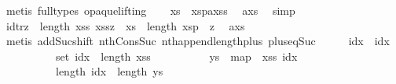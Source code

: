 \begin{isabellebody}
\ {\isacharparenleft}{\kern0pt}metis\ {\isacharparenleft}{\kern0pt}full{\isacharunderscore}{\kern0pt}types{\isacharcomma}{\kern0pt}\ opaque{\isacharunderscore}{\kern0pt}lifting{\isacharparenright}{\kern0pt}{\isacharparenright}{\kern0pt}\isanewline
\ \ \isamarkupfalse%
\ {\isachardoublequoteopen}xs\ {\isacharequal}{\kern0pt}\ {\isacharparenleft}{\kern0pt}xsp{\isacharat}{\kern0pt}{\isacharbrackleft}{\kern0pt}a{\isacharbrackright}{\kern0pt}{\isacharparenright}{\kern0pt}{\isacharat}{\kern0pt}xss{\isachardoublequoteclose}\ \isamarkupfalse%
\ a{\isacharunderscore}{\kern0pt}xs{\isacharparenleft}{\kern0pt}{}{\isacharparenright}{\kern0pt}\ \isamarkupfalse%
\ simp\isanewline
\ \ \isamarkupfalse%
\ id{\isacharunderscore}{\kern0pt}tr{\isacharcolon}{\kern0pt}{\isachardoublequoteopen}{\isasymforall}z\ {\isacharless}{\kern0pt}\ length\ xss{\isachardot}{\kern0pt}\ xss{\isacharbang}{\kern0pt}z\ {\isacharequal}{\kern0pt}\ xs{\isacharbang}{\kern0pt}{\isacharparenleft}{\kern0pt}{}\ {\isacharplus}{\kern0pt}\ length\ xsp\ {\isacharplus}{\kern0pt}\ z{\isacharparenright}{\kern0pt}{\isachardoublequoteclose}\ \isamarkupfalse%
\ a{\isacharunderscore}{\kern0pt}xs{\isacharparenleft}{\kern0pt}{}{\isacharparenright}{\kern0pt}\isanewline
\ \ \ \ \isamarkupfalse%
\ {\isacharparenleft}{\kern0pt}metis\ add{\isacharunderscore}{\kern0pt}Suc{\isacharunderscore}{\kern0pt}shift\ nth{\isacharunderscore}{\kern0pt}Cons{\isacharunderscore}{\kern0pt}Suc\ nth{\isacharunderscore}{\kern0pt}append{\isacharunderscore}{\kern0pt}length{\isacharunderscore}{\kern0pt}plus\ plus{\isacharunderscore}{\kern0pt}{}{\isacharunderscore}{\kern0pt}eq{\isacharunderscore}{\kern0pt}Suc{\isacharparenright}{\kern0pt}\isanewline
\isanewline
\ \ \isamarkupfalse%
\ \isamarkupfalse%
\ idx\ \ idx{\isacharcolon}{\kern0pt}\isanewline
\ \ \ \ \ \ \ \ \ \ {\isachardoublequoteopen}set\ idx\ {\isasymsubseteq}\ {\isacharbraceleft}{\kern0pt}{\isachardot}{\kern0pt}{\isachardot}{\kern0pt}{\isacharless}{\kern0pt}length\ xss{\isacharbraceright}{\kern0pt}{\isachardoublequoteclose}\isanewline
\ \ \ \ \ \ \ \ \ \ {\isachardoublequoteopen}ys\ {\isacharequal}{\kern0pt}\ map\ {\isacharparenleft}{\kern0pt}{\isacharparenleft}{\kern0pt}{\isacharbang}{\kern0pt}{\isacharparenright}{\kern0pt}\ xss{\isacharparenright}{\kern0pt}\ idx{\isachardoublequoteclose}\isanewline
\ \ \ \ \ \ \ \ \ \ {\isachardoublequoteopen}length\ idx\ {\isacharequal}{\kern0pt}\ length\ ys{\isachardoublequoteclose}\isanewline

\end{isabellebody}
